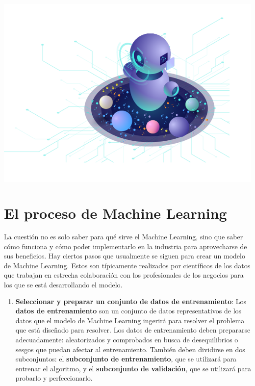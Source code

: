 \documentclass[
]{book}
\providecommand{\tightlist}{%
  \setlength{\itemsep}{0pt}\setlength{\parskip}{0pt}}
\begin{document}
\begin{center}\includegraphics{img/01-repaso/14_nosupervisado_robo} \end{center}

\hypertarget{el-proceso-de-machine-learning}{%
\section{El proceso de Machine Learning}\label{el-proceso-de-machine-learning}}

La cuestión no es solo saber para qué sirve el Machine Learning, sino que saber cómo funciona y cómo poder implementarlo en la industria para aprovecharse de sus beneficios.
Hay ciertos pasos que usualmente se siguen para crear un modelo de Machine Learning. Estos son típicamente realizados por científicos de los datos que trabajan en estrecha colaboración con los profesionales de los negocios para los que se está desarrollando el modelo.

\begin{enumerate}
\def\labelenumi{\arabic{enumi}.}
\tightlist
\item
  \textbf{Seleccionar y preparar un conjunto de datos de entrenamiento}:
  Los \textbf{datos de entrenamiento} son un conjunto de datos representativos de los datos que el modelo de Machine Learning ingerirá para resolver el problema que está diseñado para resolver.
  Los datos de entrenamiento deben prepararse adecuadamente: aleatorizados y comprobados en busca de desequilibrios o sesgos que puedan afectar al entrenamiento. También deben dividirse en dos subconjuntos: el \textbf{subconjunto de entrenamiento}, que se utilizará para entrenar el algoritmo, y el \textbf{subconjunto de validación}, que se utilizará para probarlo y perfeccionarlo.
\end{enumerate}
\end{document}
